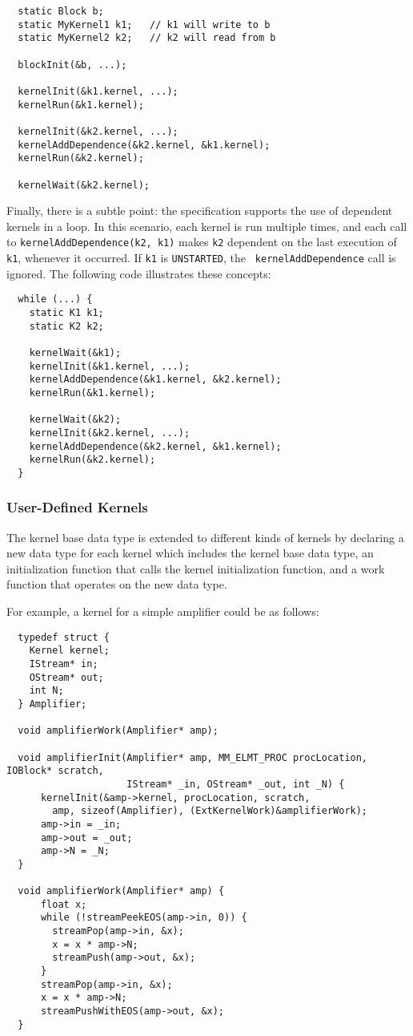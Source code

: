 {\small
\begin{verbatim}
  static Block b;
  static MyKernel1 k1;   // k1 will write to b
  static MyKernel2 k2;   // k2 will read from b

  blockInit(&b, ...);

  kernelInit(&k1.kernel, ...);  
  kernelRun(&k1.kernel);

  kernelInit(&k2.kernel, ...);
  kernelAddDependence(&k2.kernel, &k1.kernel);
  kernelRun(&k2.kernel);

  kernelWait(&k2.kernel);
\end{verbatim}}

Finally, there is a subtle point: the specification supports the use
of dependent kernels in a loop.  In this scenario, each kernel is run
multiple times, and each call to {\tt kernelAddDependence(k2, k1)}
makes {\tt k2} dependent on the last execution of {\tt k1}, whenever
it occurred. If {\tt k1} is {\tt UNSTARTED}, the {\tt
kernelAddDependence} call is ignored. The following code illustrates
these concepts:

{\small
\begin{verbatim}
  while (...) {
    static K1 k1;
    static K2 k2;

    kernelWait(&k1);
    kernelInit(&k1.kernel, ...);
    kernelAddDependence(&k1.kernel, &k2.kernel);
    kernelRun(&k1.kernel);

    kernelWait(&k2);
    kernelInit(&k2.kernel, ...);
    kernelAddDependence(&k2.kernel, &k1.kernel);
    kernelRun(&k2.kernel);
  }
\end{verbatim}}

\subsubsection{User-Defined Kernels}
\label{sec:kernelhlc}

The kernel base data type is extended to different kinds of kernels by
declaring a new data type for each kernel which includes the kernel
base data type, an initialization function that calls the kernel
initialization function, and a work function that operates on the new
data type.

For example, a kernel for a simple amplifier could be as follows:
 
{\small
\begin{verbatim}
  typedef struct {
    Kernel kernel;
    IStream* in;
    OStream* out;
    int N;
  } Amplifier;

  void amplifierWork(Amplifier* amp);

  void amplifierInit(Amplifier* amp, MM_ELMT_PROC procLocation, IOBlock* scratch, 
                     IStream* _in, OStream* _out, int _N) {
      kernelInit(&amp->kernel, procLocation, scratch, 
        amp, sizeof(Amplifier), (ExtKernelWork)&amplifierWork);
      amp->in = _in;
      amp->out = _out;
      amp->N = _N;
  }
 
  void amplifierWork(Amplifier* amp) {
      float x;
      while (!streamPeekEOS(amp->in, 0)) {
        streamPop(amp->in, &x);
        x = x * amp->N;
        streamPush(amp->out, &x);
      }
      streamPop(amp->in, &x);
      x = x * amp->N;
      streamPushWithEOS(amp->out, &x);
  }
\end{verbatim}}

